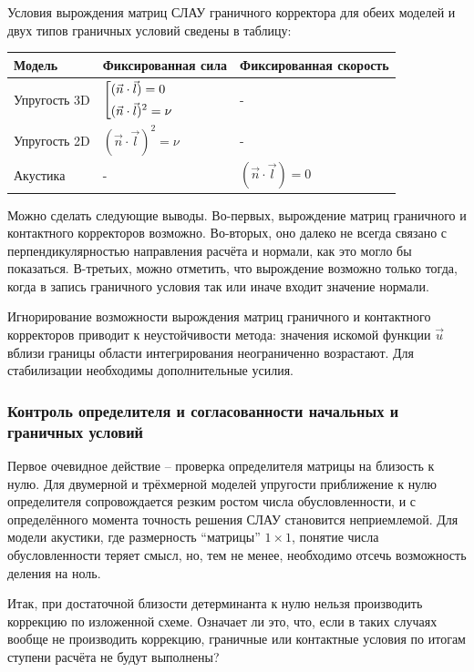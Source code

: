 \documentclass[a4paper]{article}
\numberwithin{equation}{section}
\begin{document}
Условия вырождения матриц СЛАУ граничного корректора для обеих моделей и 
двух типов граничных условий сведены в таблицу:
\begin{center}
\label{degeneracy_table}
    \begin{tabular}{ | l | l | l | }
    \hline
    Модель & Фиксированная сила & Фиксированная скорость \\ \hline
    Упругость 3D & $\left[ \begin{gathered} (\vec{n} \cdot \vec{l}) = 0  \hfill \\ (\vec{n} \cdot \vec{l})^2 = \nu \hfill \\ \end{gathered} \right.$
 & - \\ \hline
    Упругость 2D & $(\vec{n} \cdot \vec{l})^2 = \nu$ & -  \\ \hline
    Акустика & - & $(\vec{n} \cdot \vec{l}) = 0$     \\ \hline
    \end{tabular}
\end{center}

Можно сделать следующие выводы. 
Во-первых, вырождение матриц граничного и контактного корректоров возможно. 
Во-вторых, оно далеко не всегда связано с перпендикулярностью направления 
расчёта и нормали, как это могло бы показаться. 
В-третьих, можно отметить, что вырождение возможно только тогда, 
когда в запись граничного условия так или иначе входит значение нормали.

Игнорирование возможности вырождения матриц граничного и контактного 
корректоров приводит к неустойчивости метода: значения искомой функции 
$\vec{u}$ вблизи границы области интегрирования неограниченно возрастают. 
Для стабилизации необходимы дополнительные усилия.


\subsubsection{Контроль определителя и согласованности начальных и граничных условий}
Первое очевидное действие -- проверка определителя матрицы на близость к нулю. 
Для двумерной и трёхмерной моделей упругости приближение к нулю определителя 
сопровождается резким ростом числа обусловленности, и с определённого момента 
точность решения СЛАУ становится неприемлемой. Для модели акустики, где размерность 
``матрицы'' $1 \times 1$, понятие числа обусловленности теряет смысл, но,
тем не менее, необходимо отсечь возможность деления на ноль. 

Итак, при достаточной близости детерминанта к нулю нельзя производить 
коррекцию по изложенной схеме. Означает ли это, что, 
если в таких случаях вообще не производить коррекцию, 
граничные или контактные условия по итогам ступени расчёта не будут выполнены? 
\end{document}
